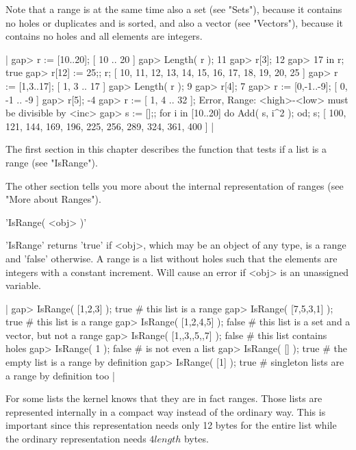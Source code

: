 Note that a range is at the same time also a set (see "Sets"), because it
contains no  holes or duplicates  and is sorted, and  also a  vector (see
"Vectors"), because it contains no holes and all elements are integers.

|    gap> r := [10..20];
    [ 10 .. 20 ]
    gap> Length( r );
    11
    gap> r[3];
    12
    gap> 17 in r;
    true
    gap> r[12] := 25;; r;
    [ 10, 11, 12, 13, 14, 15, 16, 17, 18, 19, 20, 25 ]
    gap> r := [1,3..17];
    [ 1, 3 .. 17 ]
    gap> Length( r );
    9
    gap> r[4];
    7
    gap> r := [0,-1..-9];
    [ 0, -1 .. -9 ]
    gap> r[5];
    -4
    gap> r := [ 1, 4 .. 32 ];
    Error, Range: <high>-<low> must be divisible by <inc>
    gap> s := [];;  for i  in [10..20]  do Add( s, i^2 );  od;  s;
    [ 100, 121, 144, 169, 196, 225, 256, 289, 324, 361, 400 ] |

The first section in this chapter describes  the function that tests if a
list is a range (see "IsRange").

The  other section tells  you more  about  the internal representation of
ranges (see "More about Ranges").


'IsRange( <obj> )'

'IsRange' returns 'true' if <obj>, which may be an object of any type, is
a range and 'false' otherwise.  A range is a list without holes such that
the elements are integers with a constant increment.  Will cause an error
if <obj> is an unassigned variable.

|    gap> IsRange( [1,2,3] );
    true    # this list is a range
    gap> IsRange( [7,5,3,1] );
    true    # this list is a range
    gap> IsRange( [1,2,4,5] );
    false    # this list is a set and a vector, but not a range
    gap> IsRange( [1,,3,,5,,7] );
    false    # this list contains holes
    gap> IsRange( 1 );
    false    # is not even a list
    gap> IsRange( [] );
    true    # the empty list is a range by definition
    gap> IsRange( [1] );
    true    # singleton lists are a range by definition too |


For some  lists the kernel knows   that they are  in fact  ranges.  Those
lists are represented internally in a compact way instead of the ordinary
way.  This is important since this representation needs only 12 bytes for
the entire list while the ordinary representation needs $4 length$ bytes.

